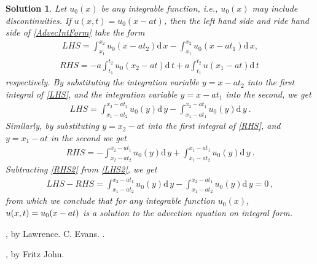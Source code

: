 \documentclass[10pt,letterpaper]{article}
\newcommand{\dif}[1][]{\mathrm{d} {#1}\,}
\newcommand{\frb}[1]{ \left(  {#1} \right) }
\theoremstyle{break}
\newtheorem{mysolution}{Solution}
\newtheorem*{mysolutioninformation}{Solution Information}
\newenvironment{solution}{\begin{mysolution}}{\end{mysolution}} \newenvironment{solutioninformation}{\begin{mysolutioninformation}}{\end{mysolutioninformation}}
\begin{document}
\begin{solution}
	Let $u_{0}(x)$ be any integrable function, i.e., $u_{0}(x)$ may include discontinuities. If $u(x,t)=u_0(x-at)$, then the left hand side and ride hand side of \eqref{AdvecIntForm} take the form
	\begin{gather} \label{LHS}
		LHS=\int_{x_{1}}^{x_{2}}u_{0}\frb{x-at_{2}}\dif x
				-\int_{x_{1}}^{x_{2}}u_{0}\frb{x-at_{1}} \dif x,
	\end{gather}
	\begin{gather} \label{RHS}
		RHS=-a\int_{t_{1}}^{t_{2}}u_{0}\frb{x_{2}-at}\dif t
				+a\int_{t_{1}}^{t_{2}}u\frb{x_{1}-at}\dif t\ 
	\end{gather}
	respectively. By substituting the integration variable $y=x-at_{2}$ into the first integral of \eqref{LHS}, and the integration variable $y=x-at_{1}$ into the second, we get
	\begin{gather} \label{LHS2}
		LHS=\int_{x_{1}-at_{2}}^{x_{2}-at_{2}}u_{0}\frb{y}\dif y
			-\int_{x_{1}-at_{1}}^{x_{2}-at_{1}}u_{0}\frb{y}\dif y\ .
	\end{gather}
	Similarly, by substituting $y=x_{2}-at$ into the first integral of \eqref{RHS}, and $y=x_{1}-at$ in the second we get 
	\begin{gather} \label{RHS2}
		RHS=- \int_{x_{2}-at_{2}}^{x_{2}-at_{1}}u_{0}\frb{y}\dif y
			+\int_{x_{1}-at_{2}}^{x_{1}-at_{1}}u_{0}\frb{y} \dif y\ .
	\end{gather}
	Subtracting \eqref{RHS2} from \eqref{LHS2}, we get
	\begin{gather}
		LHS-RHS=\int_{x_{1}-at_{2}}^{x_{2}-at_{1}}u_{0}\frb{y} \dif y
			-\int_{x_{1}-at_{2}}^{x_{2}-at_{1}}u_{0}\frb{y} \dif y=0\ ,
	\end{gather}
	from which we conclude that for any integrable function $u_{0}\!\left(x\right)$, $u\!\left(x,t\right)=u_{0}\text{\!}\left(x-at\right)$ is a solution to the advection equation on integral form.
\end{solution}
	



\begin{thebibliography}{----}
	, by Lawrence. C. Evans.
	.
	
	, by Fritz John.	
\end{thebibliography}
\end{document}
